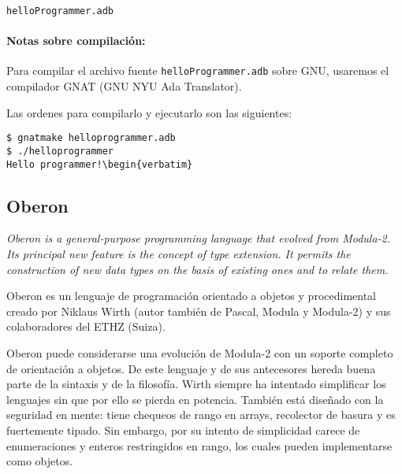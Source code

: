 \prog \texttt{helloProgrammer.adb}



\paragraph*{Notas sobre compilación:} Para compilar el archivo fuente
\texttt{helloProgrammer.adb} sobre GNU, usaremos el compilador GNAT (GNU NYU Ada
Translator). 

Las ordenes para compilarlo y ejecutarlo son las siguientes:

\begin{verbatim}
$ gnatmake helloprogrammer.adb 
$ ./helloprogrammer
Hello programmer!\begin{verbatim}

\end{verbatim}

\subsection{Oberon}

\textit{Oberon is a general-purpose programming language that evolved from
Modula-2. Its principal new
feature is the concept of type extension. It permits the construction of new
data types on the basis
of existing ones and to relate them.} \cite{book/oberon/tplo}

Oberon es un lenguaje de programación orientado a objetos y procedimental creado por Niklaus Wirth (autor también de Pascal, Modula y Modula-2) y sus colaboradores del ETHZ (Suiza).

Oberon puede considerarse una evolución de Modula-2 con un soporte completo de orientación a objetos. De este lenguaje y de sus antecesores hereda buena parte de la sintaxis y de la filosofía. Wirth siempre ha intentado simplificar los lenguajes sin que por ello se pierda en potencia. También está diseñado con la seguridad en mente: tiene chequeos de rango en arrays, recolector de basura y es fuertemente tipado. Sin embargo, por su intento de simplicidad carece de enumeraciones y enteros restringidos en rango, los cuales pueden implementarse como objetos.

